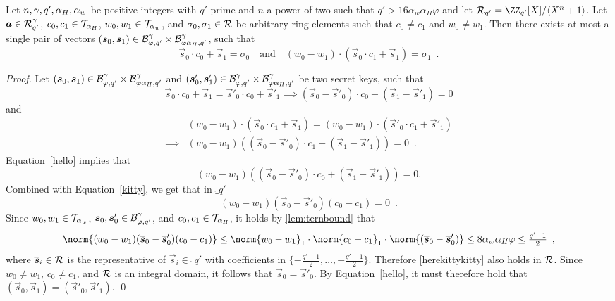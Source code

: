 \begin{lemma}\label{lem:nilssupportivechildsupport}
Let $n,\gamma,q',\alpha_H, \alpha_w$ be positive integers with $q'$ prime and $n$ a power of two such that $q' > 16 \alpha_w \alpha_H\varphi$ and let $\ring_{q'}=\defringqq$.
Let $\boldsymbol{a}\in\mathcal{R}_{q'}^\gamma$, $c_0,c_1 \in \mathcal{T}_{\alpha_{H}}$, $w_0, w_1 \in \mathcal{T}_{\alpha_w}$, and $\sigma_0,\sigma_1 \in \mathcal{R}$ be arbitrary ring elements such that $c_0\neq c_1$ and $w_0 \neq w_1$.
Then there exists at most a single pair of vectors $(\boldsymbol{s}_0,\boldsymbol{s}_1)\in\mathcal{B}_{\varphi, q'}^\gamma\times \mathcal{B}_{\varphi\alpha_H, q'}^\gamma$, such that
    \[
    \vec{s}_0\cdot c_0 + \vec{s}_1 = \sigma_0 \quad\text{and}\quad (w_0 - w_1) \cdot (\vec{s}_0\cdot c_1 + \vec{s}_1) = \sigma_1\enspace.
    \]
\end{lemma}
 \begin{proof}
    Let $(\boldsymbol{s}_0, \boldsymbol{s}_1)\in\mathcal{B}_{\varphi, q'}^\gamma\times \mathcal{B}_{\varphi\alpha_H, q'}^\gamma$ and $(\boldsymbol{s}'_0, \boldsymbol{s}'_1)\in\mathcal{B}_{\varphi, q'}^\gamma\times \mathcal{B}_{\varphi\alpha_H, q'}^\gamma$ be two secret keys, such that 
    \begin{equation}
    \vec{s}_0\cdot c_0 + \vec{s}_1 = \vec{s}'_0\cdot c_0 + \vec{s}'_1 \implies (\vec{s}_0 - \vec{s}'_0)\cdot c_0 + (\vec{s}_1 - \vec{s}'_1) = 0 \label{hello}
    \end{equation}
    and 
    \begin{equation}
    \begin{aligned}
    &(w_0 - w_1) \cdot (\vec{s}_0\cdot c_1 + \vec{s}_1) = (w_0 - w_1) \cdot (\vec{s}'_0\cdot c_1 + \vec{s}'_1)\\ \implies& (w_0 - w_1)((\vec{s}_0 - \vec{s}'_0)\cdot c_1 + (\vec{s}_1 - \vec{s}'_1)) = 0\enspace. \label{kitty}
    \end{aligned}
    \end{equation}
    Equation~\ref{hello} implies that 
    \[
    (w_0 - w_1)((\vec{s}_0 - \vec{s}'_0)\cdot c_0 + (\vec{s}_1 - \vec{s}'_1)) = 0.
    \]
    Combined with Equation~\ref{kitty}, we get that in $\ring_{q'}$
    \begin{equation}
    (w_0 - w_1)(\vec{s}_0 - \vec{s}'_0) (c_0 - c_1)  = 0\enspace. \label{herekittykitty}
    \end{equation}
    Since $w_0,w_1\in\mathcal{T}_{\alpha_w}$, $\boldsymbol{s}_0,\boldsymbol{s}'_0 \in \mathcal{B}_{\varphi, q'}^\gamma$, and $c_0,c_1\in\mathcal{T}_{\alpha_{H}}$, it holds by \autoref{lem:ternbound} that
    \[
      \norm{(w_0 - w_1)(\overline{\vec{s}}_0 - \overline{\vec{s}}'_0) (c_0 - c_1)} \leq \norm{w_0 - w_1}_1\cdot\norm{c_0 - c_1}_1\cdot \norm{(\overline{\vec{s}}_0 - \overline{\vec{s}}'_0)} \leq 8\alpha_w\alpha_H\varphi \leq \tfrac{q'-1}{2}\enspace,
    \]
    where $\overline{\boldsymbol{s}}_i\in\mathcal{R}$ is the representative of $\vec{s}_i\in\ring_{q'}$ with coefficients in $\{-\tfrac{q'-1}{2},\ldots,+\tfrac{q'-1}{2}\}$.
    Therefore \autoref{herekittykitty} also holds in $\mathcal{R}$.
    Since $w_0 \neq w_1$, $c_0 \neq c_1$, and $\mathcal{R}$ is an integral domain, it follows that $\vec{s}_0 = \vec{s}'_0$.
    By Equation~\ref{hello}, it must therefore hold that $(\vec{s}_0, \vec{s}_1) = (\vec{s}'_0, \vec{s}'_1)$.
    \qed
\end{proof}
